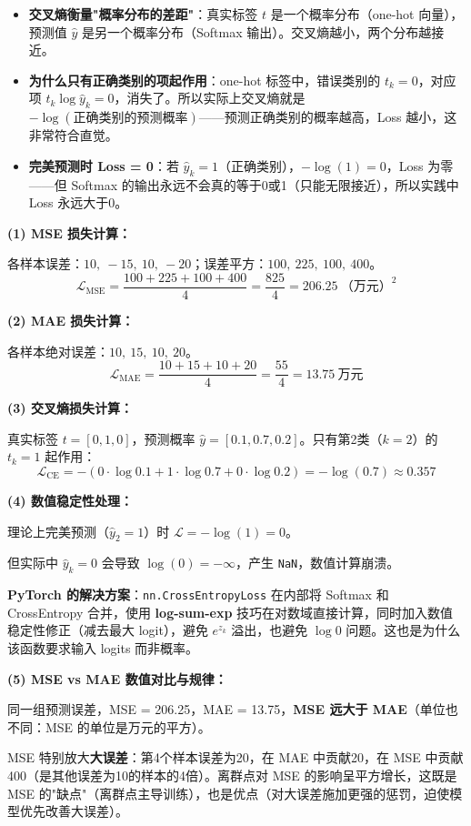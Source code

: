 \documentclass[a4paper,11pt]{ctexart}
\begin{document}
\begin{beginnerbox}
    \begin{itemize}
        \item \textbf{交叉熵衡量"概率分布的差距"}：真实标签 $t$ 是一个概率分布（one-hot 向量），预测值 $\hat{y}$ 是另一个概率分布（Softmax 输出）。交叉熵越小，两个分布越接近。
        \item \textbf{为什么只有正确类别的项起作用}：one-hot 标签中，错误类别的 $t_k = 0$，对应项 $t_k \log \hat{y}_k = 0$，消失了。所以实际上交叉熵就是 $-\log(\text{正确类别的预测概率})$——预测正确类别的概率越高，Loss 越小，这非常符合直觉。
        \item \textbf{完美预测时 Loss = 0}：若 $\hat{y}_k = 1$（正确类别），$-\log(1) = 0$，Loss 为零——但 Softmax 的输出永远不会真的等于0或1（只能无限接近），所以实践中 Loss 永远大于0。
    \end{itemize}
\end{beginnerbox}

\begin{solutionbox}[参考答案与详细解析]
    \textbf{(1) MSE 损失计算：}

    各样本误差：$10,\ -15,\ 10,\ -20$；误差平方：$100,\ 225,\ 100,\ 400$。
    \[
    \mathcal{L}_{\text{MSE}} = \frac{100 + 225 + 100 + 400}{4} = \frac{825}{4} = \boxed{206.25}\ \text{（万元）}^2
    \]

    \textbf{(2) MAE 损失计算：}

    各样本绝对误差：$10,\ 15,\ 10,\ 20$。
    \[
    \mathcal{L}_{\text{MAE}} = \frac{10 + 15 + 10 + 20}{4} = \frac{55}{4} = \boxed{13.75}\ \text{万元}
    \]

    \textbf{(3) 交叉熵损失计算：}

    真实标签 $t=[0,1,0]$，预测概率 $\hat{y}=[0.1, 0.7, 0.2]$。只有第2类（$k=2$）的 $t_k = 1$ 起作用：
    \[
    \mathcal{L}_{\text{CE}} = -(0 \cdot \log 0.1 + 1 \cdot \log 0.7 + 0 \cdot \log 0.2) = -\log(0.7) \approx \boxed{0.357}
    \]

    \textbf{(4) 数值稳定性处理：}

    理论上完美预测（$\hat{y}_2=1$）时 $\mathcal{L}=-\log(1)=0$。

    但实际中 $\hat{y}_k=0$ 会导致 $\log(0)=-\infty$，产生 \texttt{NaN}，数值计算崩溃。

    \textbf{PyTorch 的解决方案}：\texttt{nn.CrossEntropyLoss} 在内部将 Softmax 和 CrossEntropy 合并，使用 \textbf{log-sum-exp} 技巧在对数域直接计算，同时加入数值稳定性修正（减去最大 logit），避免 $e^{z_k}$ 溢出，也避免 $\log 0$ 问题。这也是为什么该函数要求输入 logits 而非概率。

    \textbf{(5) MSE vs MAE 数值对比与规律：}

    同一组预测误差，MSE = 206.25，MAE = 13.75，\textbf{MSE 远大于 MAE}（单位也不同：MSE 的单位是万元的平方）。

    MSE 特别放大\textbf{大误差}：第4个样本误差为20，在 MAE 中贡献20，在 MSE 中贡献400（是其他误差为10的样本的4倍）。离群点对 MSE 的影响呈平方增长，这既是 MSE 的"缺点"（离群点主导训练），也是优点（对大误差施加更强的惩罚，迫使模型优先改善大误差）。
\end{solutionbox}
\end{document}
